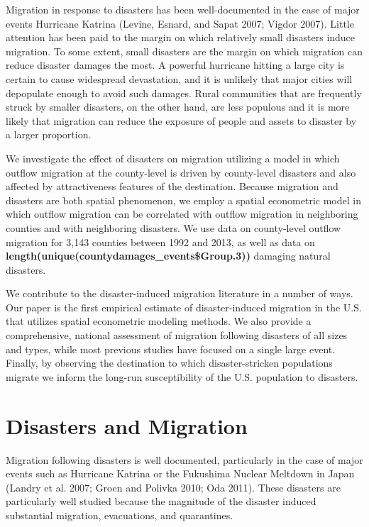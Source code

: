 \documentclass[]{article}
\begin{document}
Migration in response to disasters has been well-documented in the case
of major events Hurricane Katrina (Levine, Esnard, and Sapat 2007;
Vigdor 2007). Little attention has been paid to the margin on which
relatively small disasters induce migration. To some extent, small
disasters are the margin on which migration can reduce disaster damages
the most. A powerful hurricane hitting a large city is certain to cause
widespread devastation, and it is unlikely that major cities will
depopulate enough to avoid such damages. Rural communities that are
frequently struck by smaller disasters, on the other hand, are less
populous and it is more likely that migration can reduce the exposure of
people and assets to disaster by a larger proportion.

We investigate the effect of disasters on migration utilizing a model in
which outflow migration at the county-level is driven by county-level
disasters and also affected by attractiveness features of the
destination. Because migration and disasters are both spatial
phenomenon, we employ a spatial econometric model in which outflow
migration can be correlated with outflow migration in neighboring
counties and with neighboring disasters. We use data on county-level
outflow migration for 3,143 counties between 1992 and 2013, as well as
data on \textbf{length(unique(countydamages\_events\$Group.3))} damaging
natural disasters.

We contribute to the disaster-induced migration literature in a number
of ways. Our paper is the first empirical estimate of disaster-induced
migration in the U.S. that utilizes spatial econometric modeling
methods. We also provide a comprehensive, national assessment of
migration following disasters of all sizes and types, while most
previous studies have focused on a single large event. Finally, by
observing the destination to which disaster-stricken populations migrate
we inform the long-run susceptibility of the U.S. population to
disasters.

\section{Disasters and Migration}\label{disasters-and-migration}

Migration following disasters is well documented, particularly in the
case of major events such as Hurricane Katrina or the Fukushima Nuclear
Meltdown in Japan (Landry et al. 2007; Groen and Polivka 2010; Oda
2011). These disasters are particularly well studied because the
magnitude of the disaster induced substantial migration, evacuations,
and quarantines.
\end{document}
